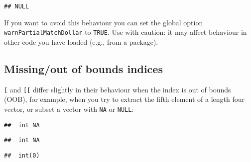 \begin{verbatim}
## NULL
\end{verbatim}

If you want to avoid this behaviour you can set the global option
\texttt{warnPartialMatchDollar} to \texttt{TRUE}. Use with caution: it
may affect behaviour in other code you have loaded (e.g., from a
package).

\hypertarget{missingout-of-bounds-indices}{%
\subsection{Missing/out of bounds
indices}\label{missingout-of-bounds-indices}}

\texttt{{[}} and \texttt{{[}{[}} differ slightly in their behaviour when
the index is out of bounds (OOB), for example, when you try to extract
the fifth element of a length four vector, or subset a vector with
\texttt{NA} or \texttt{NULL}: 

\begin{Shaded}
\begin{Highlighting}[]
\StringTok{ }\OperatorTok{:}
\NormalTok{(x[}\NormalTok{])}
\end{Highlighting}
\end{Shaded}

\begin{verbatim}
##  int NA
\end{verbatim}

\begin{Shaded}
\begin{Highlighting}[]
\NormalTok{(x[}\NormalTok{])}
\end{Highlighting}
\end{Shaded}

\begin{verbatim}
##  int NA
\end{verbatim}

\begin{Shaded}
\begin{Highlighting}[]
\NormalTok{(x[}\NormalTok{])}
\end{Highlighting}
\end{Shaded}

\begin{verbatim}
##  int(0)
\end{verbatim}

